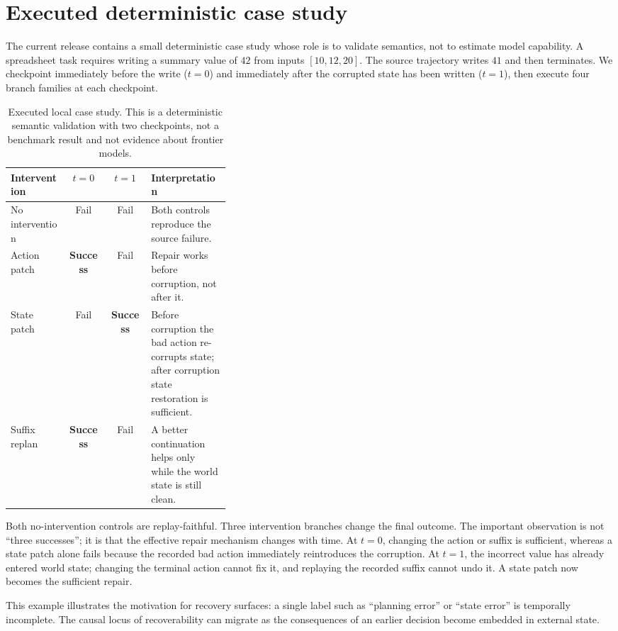\documentclass{article}
\begin{document}
\section{Executed deterministic case study}
\label{sec:case}

The current release contains a small deterministic case study whose role is to validate semantics, not to estimate model capability. A spreadsheet task requires writing a summary value of $42$ from inputs $[10,12,20]$. The source trajectory writes $41$ and then terminates. We checkpoint immediately before the write ($t=0$) and immediately after the corrupted state has been written ($t=1$), then execute four branch families at each checkpoint.

\begin{table}[t]
\centering
\small
\begin{tabular}{lccp{0.36\linewidth}}
\toprule
\textbf{Intervention} & $t=0$ & $t=1$ & \textbf{Interpretation} \\
\midrule
No intervention & Fail & Fail & Both controls reproduce the source failure. \\
Action patch & \textbf{Success} & Fail & Repair works before corruption, not after it. \\
State patch & Fail & \textbf{Success} & Before corruption the bad action re-corrupts state; after corruption state restoration is sufficient. \\
Suffix replan & \textbf{Success} & Fail & A better continuation helps only while the world state is still clean. \\
\bottomrule
\end{tabular}
\caption{Executed local case study. This is a deterministic semantic validation with two checkpoints, not a benchmark result and not evidence about frontier models.}
\label{tab:case}
\end{table}

Both no-intervention controls are replay-faithful. Three intervention branches change the final outcome. The important observation is not ``three successes''; it is that the effective repair mechanism changes with time. At $t=0$, changing the action or suffix is sufficient, whereas a state patch alone fails because the recorded bad action immediately reintroduces the corruption. At $t=1$, the incorrect value has already entered world state; changing the terminal action cannot fix it, and replaying the recorded suffix cannot undo it. A state patch now becomes the sufficient repair.

This example illustrates the motivation for recovery surfaces: a single label such as ``planning error'' or ``state error'' is temporally incomplete. The causal locus of recoverability can migrate as the consequences of an earlier decision become embedded in external state.
\end{document}

